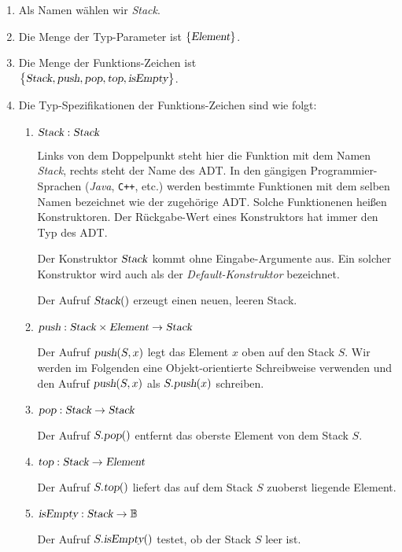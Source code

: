\begin{enumerate}
\item Als Namen w\"ahlen wir \textsl{Stack}.
\item Die Menge der Typ-Parameter ist $\{ \textsl{Element} \}$.
\item Die Menge der Funktions-Zeichen ist \\[0.1cm]
      \hspace*{1.3cm} 
      $\bigl\{ \textsl{Stack}, \textsl{push}, \textsl{pop}, \textsl{top}, \textsl{isEmpty} \bigr\}$.
\item Die Typ-Spezifikationen der Funktions-Zeichen sind wie folgt:
      \begin{enumerate}
      \item $\textsl{Stack}: \textsl{Stack}$

            Links von dem Doppelpunkt steht hier die Funktion mit dem Namen
            \textsl{Stack}, rechts steht der Name des ADT.  In den g\"angigen
            Programmier-Sprachen (\textsl{Java}, \texttt{C++}, etc.) 
            werden bestimmte Funktionen mit dem selben Namen bezeichnet wie der zugeh\"orige
            ADT.  Solche Funktionenen hei{\ss}en Konstruktoren.  Der R\"uckgabe-Wert eines
            Konstruktors hat immer den Typ des ADT.

            Der Konstruktor $\textsl{Stack}$ kommt ohne Eingabe-Argumente aus.  Ein
            solcher Konstruktor wird auch als der \emph{Default-Konstruktor} bezeichnet.
            
            Der Aufruf $\textsl{Stack}()$ erzeugt einen neuen, leeren Stack.
      \item $\textsl{push}: \textsl{Stack} \times \textsl{Element} \rightarrow \textsl{Stack}$

            Der Aufruf $\textsl{push}(S,x)$ legt das Element $x$ oben auf den Stack $S$.
            Wir werden im Folgenden eine Objekt-orientierte Schreibweise verwenden und
            den Aufruf  $\textsl{push}(S,x)$ als $S.\textsl{push}(x)$ schreiben.
      \item $\textsl{pop}: \textsl{Stack}  \rightarrow \textsl{Stack}$

            Der Aufruf $S.\textsl{pop}()$ entfernt das oberste Element von dem Stack $S$.
      \item $\textsl{top}: \textsl{Stack} \rightarrow \textsl{Element}$

            Der Aufruf $S.\textsl{top}()$ liefert das auf dem Stack $S$ zuoberst liegende Element. 
      \item $\textsl{isEmpty}: \textsl{Stack} \rightarrow \mathbb{B}$

            Der Aufruf $S.\textsl{isEmpty}()$ testet, ob der Stack $S$ leer ist.
      \end{enumerate}
\end{enumerate}
